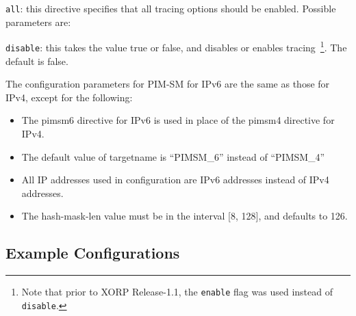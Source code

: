 \begin{description}
\begin{description}
\begin{description}
\item{\tt all}: this directive specifies that all tracing
  options should be enabled.  Possible parameters are:
\begin{description}
\item{\tt disable}: this takes the value {\stt true} or {\stt false},
  and disables or enables tracing~\footnote{Note
  that prior to XORP Release-1.1, the {\tt enable} flag was used instead of
  {\tt disable}.}. The default is {\stt false}.
\end{description}
\end{description}
\end{description}
\end{description}

The configuration parameters for PIM-SM for IPv6 are the same as those
for IPv4, except for the following:
\begin{itemize}
\item The {\stt pimsm6} directive for IPv6 is used in place of the
  {\stt pimsm4} directive for IPv4.
\item The default value of {\stt targetname} is ``{\stt PIMSM\_6}''
  instead of ``{\stt PIMSM\_4}''
\item All IP addresses used in configuration are IPv6 addresses
  instead of IPv4 addresses.
\item The {\stt hash-mask-len} value must be in the interval [8, 128],
  and defaults to 126.
\end{itemize}

\newpage
\subsection{Example Configurations}

